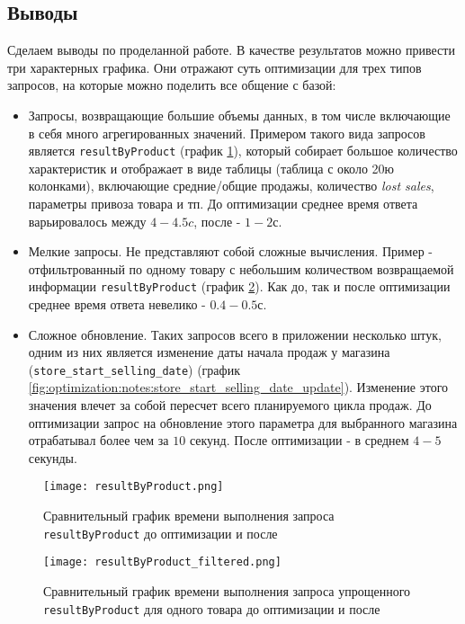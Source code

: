 \subsection{Выводы}
\label{sec:optimization:notes}

Сделаем выводы по проделанной работе. В качестве результатов можно привести три характерных графика. Они отражают суть оптимизации для трех типов запросов, на которые можно поделить все общение с базой:

\begin{itemize}
  \item Запросы, возвращающие большие объемы данных, в том числе включающие в себя много агрегированных значений. Примером такого вида запросов является \lstinline{resultByProduct} (график \ref{fig:optimization:notes:result_by_product}), который собирает большое количество характеристик и отображает в виде таблицы (таблица с около 20ю колонками), включающие средние/общие продажы, количество \emph{lost sales}, параметры привоза товара и тп. До оптимизации среднее время ответа варьировалось между $4-4.5 c$, после - $1-2 с$.
  \item Мелкие запросы. Не представляют собой сложные вычисления. Пример - отфильтрованный по одному товару с небольшим количеством возвращаемой информации \lstinline{resultByProduct} (график \ref{fig:optimization:notes:result_by_product_filtered}). Как до, так и после оптимизации среднее время ответа невелико - $0.4-0.5 с$.
  \item Сложное обновление. Таких запросов всего в приложении несколько штук, одним из них является изменение даты начала продаж у магазина (\lstinline{store_start_selling_date}) (график \ref{fig:optimization:notes:store_start_selling_date_update}). Изменение этого значения влечет за собой пересчет всего планируемого цикла продаж. До оптимизации запрос на обновление этого параметра для выбранного магазина отрабатывал более чем за $10$ секунд. После оптимизации - в среднем $4-5$ секунды.
\end{itemize}

\begin{figure}
	\centering
	\texttt{[image: resultByProduct.png]}
	\caption{Сравнительный график времени выполнения запроса \lstinline{resultByProduct} до оптимизации и после}
	\label{fig:optimization:notes:result_by_product}
\end{figure}

\begin{figure}
	\centering
	\texttt{[image: resultByProduct\_filtered.png]}
	\caption{Сравнительный график времени выполнения запроса упрощенного  \lstinline{resultByProduct} для одного товара до оптимизации и после}
	\label{fig:optimization:notes:result_by_product_filtered}
\end{figure}

